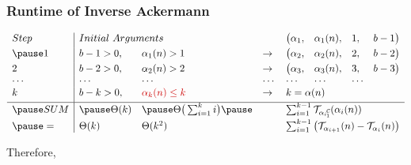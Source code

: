 \begin{frame}
\frametitle{Runtime of Inverse Ackermann}

\pause
\begin{equation*}
\begin{array}{l|llllllll}
Step & \multicolumn{2}{l}{Initial \ Arguments} &  &  \big(\alpha_1, & \alpha_1(n), & 1, & b - 1 \big) \\[3pt]
\pause 1 & b - 1 > 0, & \alpha_1(n) > 1 & \to & \big(\alpha_2, & \alpha_2(n), & 2, & b - 2\big) \\[3pt]
2 & b - 2 > 0, & \alpha_2(n) > 2 & \to  & \big(\alpha_3, & \alpha_3(n), & 3, & b - 3\big) \\
\cdots & \cdots &\cdots & \cdots & \cdots & \cdots & \cdots \\
k & b - k > 0, & {\color{red} \alpha_{k}(n) \le k} & \to  & \multicolumn{4}{l}{k = \alpha(n)} \\[3pt] \hline
\pause SUM & \pause \Theta(k) & \pause \Theta\big(\sum_{i=1}^{k}i\big) \pause & & \multicolumn{4}{l}{\sum_{i=1}^{k-1} \runtime_{\cdt{\alpha_i}{1}} (\alpha_i(n))} \\[3pt]
\pause = & \Theta(k) & \Theta(k^2) & & \multicolumn{4}{l}{\sum_{i=1}^{k-1} \big(\runtime_{\alpha_{i+1}}(n) - \runtime_{\alpha_i}(n) \big)}
\end{array}
\end{equation*}

\smallskip

\pause
Therefore, 

\end{frame}